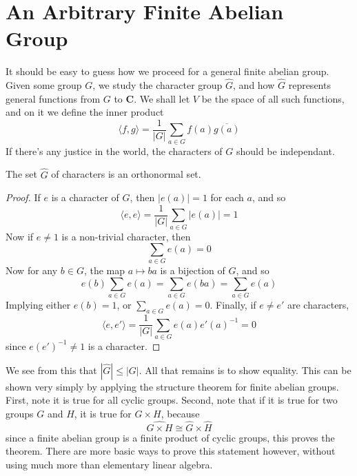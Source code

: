 \section{An Arbitrary Finite Abelian Group}

It should be easy to guess how we proceed for a general finite abelian group. Given some group $G$, we study the character group $\hat{G}$, and how $\hat{G}$ represents general functions from $G$ to $\mathbf{C}$. We shall let $V$ be the space of all such functions, and on it we define the inner product
%
\[ \langle f, g \rangle = \frac{1}{|G|} \sum_{a \in G} f(a) \overline{g(a)} \]
%
If there's any justice in the world, the characters of $G$ should be independant.

\begin{theorem}
    The set $\hat{G}$ of characters is an orthonormal set.
\end{theorem}
\begin{proof}
    If $e$ is a character of $G$, then $|e(a)| = 1$ for each $a$, and so
    \[ \langle e, e \rangle = \frac{1}{|G|} \sum_{a \in G} |e(a)| = 1 \]
    Now if $e \neq 1$ is a non-trivial character, then
    \[ \sum_{a \in G} e(a) = 0 \]
    Now for any $b \in G$, the map $a \mapsto ba$ is a bijection of $G$, and so
    \[ e(b) \sum_{a \in G} e(a) = \sum_{a \in G} e(ba) = \sum_{a \in G} e(a) \]
    Implying either $e(b) = 1$, or $\sum_{a \in G} e(a) = 0$. Finally, if $e \neq e'$ are characters,
    \[ \langle e, e' \rangle = \frac{1}{|G|} \sum_{a \in G} e(a) e'(a)^{-1} = 0 \]
    since $e(e')^{-1} \neq 1$ is a character.
\end{proof}

We see from this that $|\hat{G}| \leq |G|$. All that remains is to show equality. This can be shown very simply by applying the structure theorem for finite abelian groups. First, note it is true for all cyclic groups. Second, note that if it is true for two groups $G$ and $H$, it is true for $G \times H$, because
%
\[ \widehat{G \times H} \cong \hat{G} \times \hat{H} \]
%
since a finite abelian group is a finite product of cyclic groups, this proves the theorem. There are more basic ways to prove this statement however, without using much more than elementary linear algebra.

